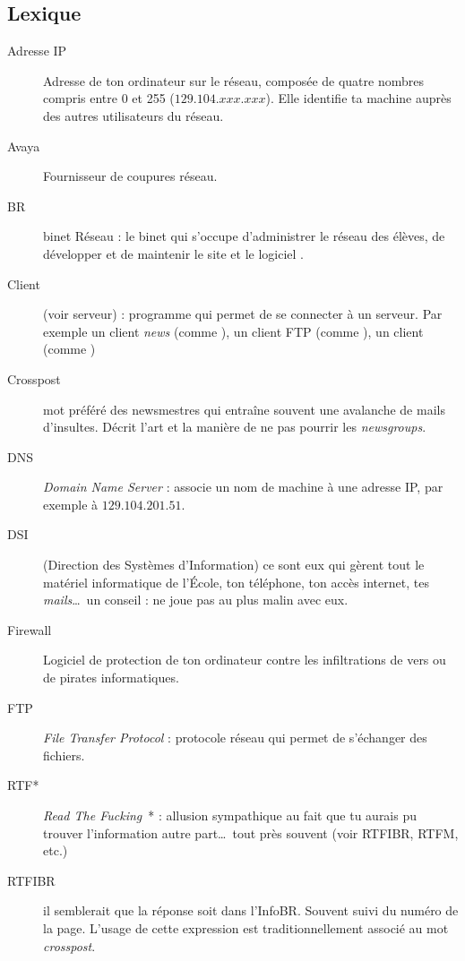 
\subsection{Lexique}

\begin{description}
  \item[Adresse IP] Adresse de ton ordinateur sur le réseau, composée de quatre nombres compris entre 0 et 255  ($129.104.xxx.xxx$). Elle identifie ta machine auprès des autres utilisateurs du réseau.
  \item[Avaya] Fournisseur de coupures réseau.
  \item[BR] binet Réseau : le binet qui s'occupe d'administrer le réseau des élèves, de développer et de maintenir le site  et le logiciel .
  \item[Client] (voir serveur) : programme qui permet de se connecter à un serveur. Par exemple un client \emph{news} (comme ), un client FTP (comme ), un client  (comme )
  \item[Crosspost] mot préféré des newsmestres qui entraîne souvent une avalanche de mails d'insultes. Décrit l'art et la manière de ne pas pourrir les \emph{newsgroups}.
  \item[DNS] \emph{Domain Name Server} : associe un nom de machine à une adresse IP, par exemple  à  $129.104.201.51$.
  \item[DSI] (Direction des Systèmes d'Information) ce sont eux qui gèrent tout le matériel informatique de l'\'Ecole, ton téléphone, ton accès internet, tes \emph{mails}\ldots\ un conseil : ne joue pas au plus malin avec eux.
  \item[Firewall] Logiciel de protection de ton ordinateur contre les infiltrations de vers ou de pirates informatiques.
  \item[FTP] \emph{File Transfer Protocol} : protocole réseau qui permet de s'échanger des fichiers.
  \item[RTF*] \emph{Read The Fucking}\ * : allusion sympathique au fait que tu aurais pu trouver l'information autre part\ldots\ tout près souvent (voir RTFIBR, RTFM, etc.)
  \item[RTFIBR] il semblerait que la réponse soit dans l'InfoBR. Souvent suivi du numéro de la page. L'usage de cette expression est traditionnellement associé au mot \emph{crosspost}.

\end{description}
